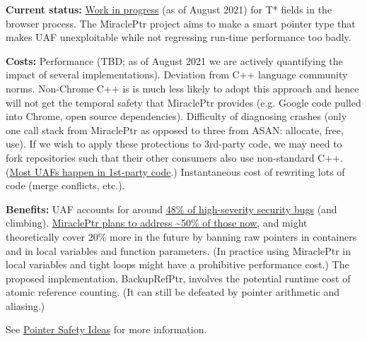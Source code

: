 \documentclass[a4paper,12pt,notitlepage,twoside,openright]{article}
\begin{document}
\textbf{Current
status:} \href{https://www.google.com/url?q=https://docs.google.com/document/d/1pnnOAIz_DMWDI4oIOFoMAqLnf_MZ2GsrJNb_dbQ3ZBg/edit\%23\&sa=D\&source=editors\&ust=1631944129029000\&usg=AOvVaw0-NEg9SdvTBD7GYlBrO6gZ}{Work
in progress} (as of August 2021) for T* fields in the browser process.
The MiraclePtr project aims to make a smart pointer type that makes UAF
unexploitable while not regressing run-time performance too badly.

\textbf{Costs:} Performance (TBD; as of August 2021 we are actively
quantifying the impact of several implementations). Deviation from C++
language community norms. Non-Chrome C++ is is much less likely to adopt
this approach and hence will not get the temporal safety that MiraclePtr
provides (e.g. Google code pulled into Chrome, open source
dependencies). Difficulty of diagnosing crashes (only one call stack
from MiraclePtr as opposed to three from ASAN: allocate, free, use). If
we wish to apply these protections to 3rd-party code, we may need to
fork repositories such that their other consumers also use non-standard
C++.
(\href{https://www.google.com/url?q=https://docs.google.com/document/d/1VTJAqsQ004ydSPxPcFirM1ukS8uvmR49ppA4OM_9AQI/edit\%23heading\%3Dh.bcg0gbbh7czw\&sa=D\&source=editors\&ust=1631944129030000\&usg=AOvVaw2DZvpSd5eI5011eUSDEuWz}{Most
UAFs happen in 1st-party code}.) Instantaneous cost of rewriting lots
of code (merge conflicts, etc.).

\textbf{Benefits:} UAF accounts for
around \href{https://docs.google.com/document/d/e/2PACX-1vRZr-HJcYmf2Y76DhewaiJOhRNpjGHCxliAQTBhFxzv1QTae9o8mhBmDl32CRIuaWZLt5kVeH9e9jXv/pub\#h.eoikp3r0cwlf}{48\%
of high-severity security bugs} (and
climbing). \href{https://www.google.com/url?q=https://docs.google.com/document/d/1VTJAqsQ004ydSPxPcFirM1ukS8uvmR49ppA4OM_9AQI/edit\%23heading\%3Dh.x9snb54sjlu9\&sa=D\&source=editors\&ust=1631944129031000\&usg=AOvVaw3aIt6uoCrntz84P6hQy0BL}{MiraclePtr
plans to address \textasciitilde50\% of those now}, and might
theoretically cover 20\% more in the future by banning raw pointers in
containers and in local variables and function parameters. (In practice
using MiraclePtr in local variables and tight loops might have a
prohibitive performance cost.) The proposed
implementation, BackupRefPtr, involves the potential runtime cost of
atomic reference counting. (It can still be defeated by pointer
arithmetic and aliasing.)

See \href{https://www.google.com/url?q=https://docs.google.com/document/d/1qsPh8Bcrma7S-5fobbCkBkXWaAijXOnorEqvIIGKzc0/edit\%23heading\%3Dh.j7d3wg2h6goh\&sa=D\&source=editors\&ust=1631944129032000\&usg=AOvVaw2lgrxYIr80YnxorY2-jq0J}{Pointer
Safety Ideas} for more information.
\end{document}
